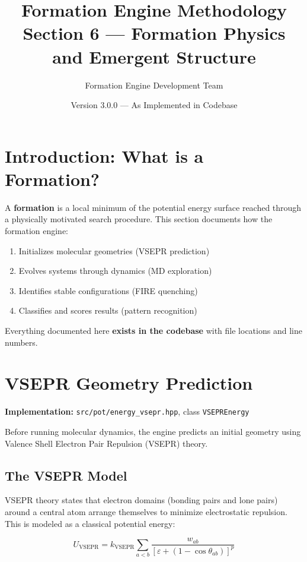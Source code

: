 \documentclass[11pt]{article}
\title{\textbf{Formation Engine Methodology} \\
\Large Section 6 — Formation Physics and Emergent Structure}
\author{Formation Engine Development Team}
\date{Version 3.0.0 — As Implemented in Codebase}
\begin{document}
\maketitle

\section{Introduction: What is a Formation?}

A \textbf{formation} is a local minimum of the potential energy surface reached through a physically motivated search procedure. This section documents how the formation engine:

\begin{enumerate}
\item Initializes molecular geometries (VSEPR prediction)
\item Evolves systems through dynamics (MD exploration)
\item Identifies stable configurations (FIRE quenching)
\item Classifies and scores results (pattern recognition)
\end{enumerate}

Everything documented here \textbf{exists in the codebase} with file locations and line numbers.

\section{VSEPR Geometry Prediction}

\textbf{Implementation:} \texttt{src/pot/energy\_vsepr.hpp}, class \texttt{VSEPREnergy}

Before running molecular dynamics, the engine predicts an initial geometry using Valence Shell Electron Pair Repulsion (VSEPR) theory.

\subsection{The VSEPR Model}

VSEPR theory states that electron domains (bonding pairs and lone pairs) around a central atom arrange themselves to minimize electrostatic repulsion. This is modeled as a classical potential energy:

\begin{equation}
U_{\text{VSEPR}} = k_{\text{VSEPR}} \sum_{a<b} \frac{w_{ab}}{[\varepsilon + (1 - \cos\theta_{ab})]^p}
\end{equation}
\end{document}
